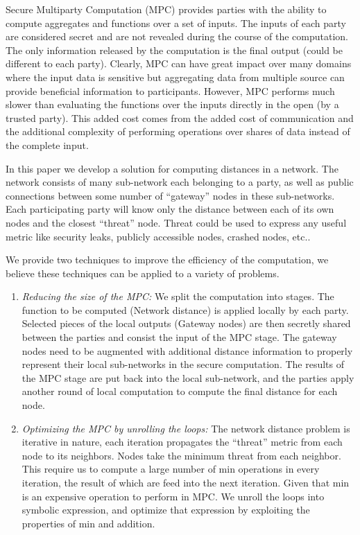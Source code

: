 Secure Multiparty Computation (MPC) provides parties with the ability to compute aggregates and functions over a set of inputs. The inputs of each party are considered secret and are not revealed during the course of the computation. The only information released by the computation is the final output (could be different to each party). Clearly, MPC can have great impact over many domains where the input data is sensitive but aggregating data from multiple source can provide beneficial information to participants. However, MPC performs much slower than evaluating the functions over the inputs directly in the open (by a trusted party). This added cost comes from the added cost of communication and the additional complexity of performing operations over shares of data instead of the complete input. \newline

In this paper we develop a solution for computing distances in a network. The network consists of many sub-network each belonging to a party, as well as public connections between some number of ``gateway'' nodes in these sub-networks. Each participating party will know only the distance between each of its own nodes and the closest ``threat'' node. Threat could be used to express any useful metric like security leaks, publicly accessible nodes, crashed nodes, etc.. \newline

We provide two techniques to improve the efficiency of the computation, we believe these techniques can be applied to a variety of problems. 
\begin{enumerate}
\item \emph{Reducing the size of the MPC:} We split the computation into stages. The function to be computed (Network distance) is applied locally by each party. Selected pieces of the local outputs (Gateway nodes) are then secretly shared between the parties and consist the input of the MPC stage. The gateway nodes need to be augmented with additional distance information to properly represent their local sub-networks in the secure computation. The results of the MPC stage are put back into the local sub-network, and the parties apply another round of local computation to compute the final distance for each node.
\item \emph{Optimizing the MPC by unrolling the loops:} The network distance problem is iterative in nature, each iteration propagates the ``threat'' metric from each node to its neighbors. Nodes take the minimum threat from each neighbor. This require us to compute a large number of min operations in every iteration, the result of which are feed into the next iteration. Given that min is an expensive operation to perform in MPC. We unroll the loops into symbolic expression, and optimize that expression by exploiting the properties of min and addition. 
\end{enumerate}

